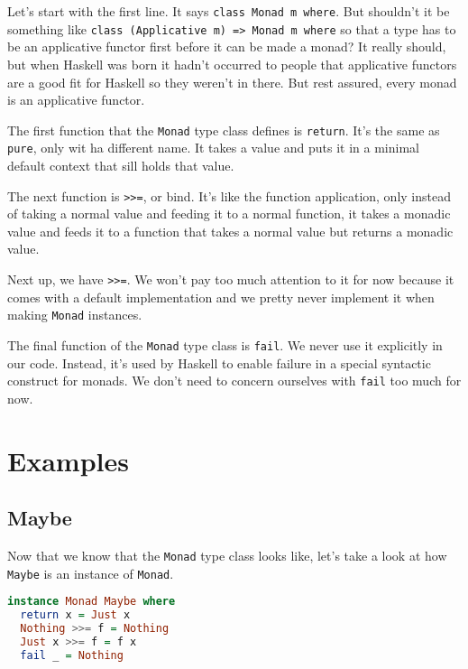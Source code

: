 Let's start with the first line. It says \texttt{class Monad m where}. But shouldn't it be something like \texttt{class (Applicative m) => Monad m where} so that a type has to be an applicative functor first before it can be made a monad? It really should, but when Haskell was born it hadn't occurred to people that applicative functors are a good fit for Haskell so they weren't in there. But rest assured, every monad is an applicative functor. 
\linebreak \linebreak

The first function that the \texttt{Monad} type class defines is \texttt{return}. It's the same as \texttt{pure}, only wit ha different name. It takes a value and puts it in a minimal default context that sill holds that value.
\linebreak \linebreak

The next function is \texttt{>>=}, or bind. It's like the function application, only instead of taking a normal value and feeding it to a normal function, it takes a monadic value and feeds it to a function that takes a normal value but returns a monadic value. 
\linebreak \linebreak

Next up, we have \texttt{>>=}. We won't pay too much attention to it for now because it comes with a default implementation and we pretty never implement it when making \texttt{Monad} instances.
\linebreak \linebreak

The final function of the \texttt{Monad} type class is \texttt{fail}. We never use it explicitly in our code. Instead, it's used by Haskell to enable failure in a special syntactic construct for monads. We don't need to concern ourselves with \texttt{fail} too much for now.


\section{Examples}
\subsection{Maybe}
Now that we know that the \texttt{Monad} type class looks like, let's take a look at how \texttt{Maybe} is an instance of \texttt{Monad}.

\begin{lstlisting}[language=haskell]
instance Monad Maybe where
  return x = Just x
  Nothing >>= f = Nothing
  Just x >>= f = f x
  fail _ = Nothing
\end{lstlisting}


